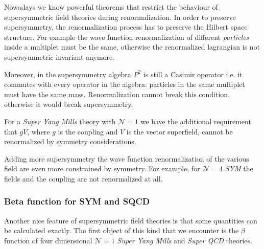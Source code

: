 Nowadays we know powerful theorems that restrict the behaviour of supersymmetric field theories during renormalization.
In order to preserve supersymmetry, the renormalization process has to preserve the Hilbert space structure. For example the wave function renormalization of different \emph{particles} inside a multiplet must be the same, otherwise the renormalized lagrangian is not supersymmetric invariant anymore. 

Moreover, in the supersymmetry algebra $P^2$ is still a Casimir operator i.e. it commutes with every operator in the algebra: particles in the same multiplet must have the same mass.
Renormalization cannot break this condition, otherwise it would break supersymmetry.

For a \emph{Super Yang Mills} theory with $\mathcal{N} = 1$ we have the additional requirement that $g V$, where $g$ is the coupling and $V$ is the vector superfield, cannot be renormalized by symmetry considerations. 

Adding more supersymmetry the wave function renormalization of the various field are even more constrained by symmetry.
For example, for $\mathcal{N}=4$ \emph{SYM} the fields and the coupling are not renormalized at all.

















\subsubsection{Beta function for SYM and SQCD}
Another nice feature of supersymmetric field theories is that some quantities can be calculated exactly.
The first object of this kind that we encounter is the $\beta$ function of four dimensional $\mathcal{N} =  1 $ \emph{Super Yang Mills} and \emph{Super QCD} theories.

